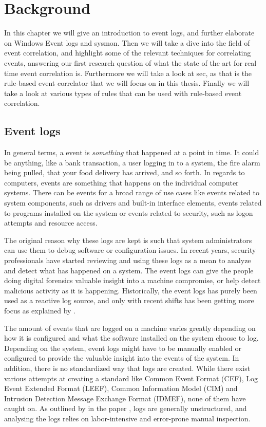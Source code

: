 \chapter{Background}
\label{chap:background}

In this chapter we will give an introduction to event logs, and further elaborate on Windows Event logs and \acrfull{sysmon}.
Then we will take a dive into the field of event correlation, and highlight some of the relevant techniques for correlating events, answering our first research question of what the state of the art for real time event correlation is.
Furthermore we will take a look at \acrfull{sec}, as that is the rule-based event correlator that we will focus on in this thesis.
Finally we will take a look at various types of rules that can be used with rule-based event correlation.

\section{Event logs}
\label{sec:event-logs}
In general terms, a event is \textit{something} that happened at a point in time. It could be anything, like a bank transaction, a user logging in to a system, the fire alarm being pulled, that your food delivery has arrived, and so forth.
In regards to computers, events are something that happens on the individual computer systems. There can be events for a broad range of use cases like events related to system components, such as drivers and built-in interface elements, events related to programs installed on the system or events related to security, such as logon attempts and resource access.

The original reason why these logs are kept is such that system administrators can use them to debug software or configuration issues. In recent years, security professionals have started reviewing and using these logs as a mean to analyze and detect what has happened on a system. The event logs can give the people doing digital forensics valuable insight into a machine compromise, or help detect malicious activity as it is happening. Historically, the event logs has purely been used as a reactive log source, and only with recent shifts has been getting more focus as explained by \textcite{He_2017}.

The amount of events that are logged on a machine varies greatly depending on how it is configured and what the software installed on the system choose to log. Depending on the system, event logs might have to be manually enabled or configured to provide the valuable insight into the events of the system.
In addition, there is no standardized way that logs are created. While there exist various attempts at creating a standard like Common Event Format (CEF)\cite{CEF}, Log Event Extended Format (LEEF)\cite{LEEF}, Common Information Model (CIM)\cite{CIM} and Intrusion Detection Message Exchange Format (IDMEF)\cite{IDMEF}, none of them have caught on. As outlined by \textcite{He_2018} in the paper , logs are generally unstructured, and analysing the logs relies on labor-intensive and error-prone manual inspection.

